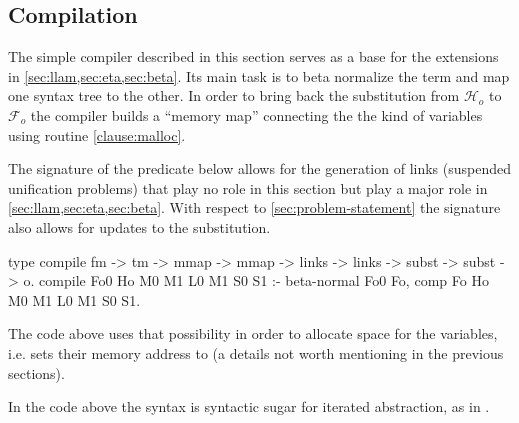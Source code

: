 \documentclass[sigconf,natbib=false,review]{acmart}
\newcommand{\llambda}{\ensuremath{\mathcal{L}}\xspace}
\newcommand{\Fo}{\texorpdfstring{\ensuremath{\mathcal{F}_{\!o}\xspace}}{Fo}} %
\newcommand{\Ho}{\texorpdfstring{\ensuremath{\mathcal{H}_o}\xspace}{Ho}}
\begin{document}



\subsection{Compilation}
\label{sec:compilation}

The simple compiler described in this section serves as a base for the
extensions in \cref{sec:llam,sec:eta,sec:beta}.
Its main task is to beta normalize the term and map one syntax tree to
the other.
In order to bring back the substitution from \Ho{} to \Fo{} the compiler
builds a ``memory map'' connecting the the kind of variables using routine
\ref{clause:malloc}.

The signature of the  predicate below allows for the generation of
links (suspended unification problems) that play no role in this section
but play a major role in \cref{sec:llam,sec:eta,sec:beta}.
With respect to \cref{sec:problem-statement} the signature also allows
for updates to the substitution.


\begin{elpicode}
type compile fm -> tm -> mmap -> mmap -> links -> links ->
  subst -> subst -> o.
compile Fo0 Ho M0 M1 L0 M1 S0 S1 :-
  beta-normal Fo0 Fo, comp Fo Ho M0 M1 L0 M1 S0 S1.
\end{elpicode}

\noindent
The code above uses that possibility
in order to allocate space for the variables, i.e. sets their memory
address to  (a details not worth mentioning in the
previous sections).



\noindent
In the code above the syntax  is syntactic sugar for
iterated  abstraction, as in .
\end{document}
